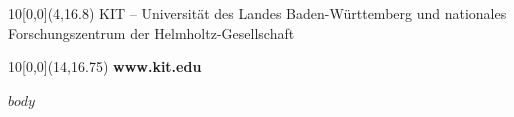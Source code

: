 \documentclass{thesisclass}
\begin{document}
\begin{titlepage}
	\vspace{2cm}


	\begin{textblock}{10}[0,0](4,16.8)
	\tiny{ 
			{KIT -- Universität des Landes Baden-Württemberg und nationales Forschungszentrum der Helmholtz-Gesellschaft}
	}
	\end{textblock}

	\begin{textblock}{10}[0,0](14,16.75)
	\large{
		\textbf{www.kit.edu} 
	}
	\end{textblock}

	\end{titlepage}
\blankpage


\tableofcontents
\blankpage


\mainmatter
{}

$body$

\Erklaerung
\end{document}
